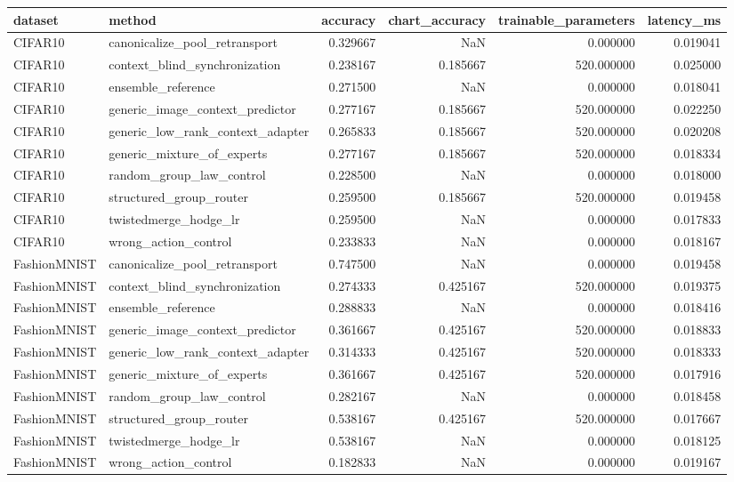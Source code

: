 \begin{tabular}{llrrrr}
\toprule
dataset & method & accuracy & chart_accuracy & trainable_parameters & latency_ms \\
\midrule
CIFAR10 & canonicalize_pool_retransport & 0.329667 & NaN & 0.000000 & 0.019041 \\
CIFAR10 & context_blind_synchronization & 0.238167 & 0.185667 & 520.000000 & 0.025000 \\
CIFAR10 & ensemble_reference & 0.271500 & NaN & 0.000000 & 0.018041 \\
CIFAR10 & generic_image_context_predictor & 0.277167 & 0.185667 & 520.000000 & 0.022250 \\
CIFAR10 & generic_low_rank_context_adapter & 0.265833 & 0.185667 & 520.000000 & 0.020208 \\
CIFAR10 & generic_mixture_of_experts & 0.277167 & 0.185667 & 520.000000 & 0.018334 \\
CIFAR10 & random_group_law_control & 0.228500 & NaN & 0.000000 & 0.018000 \\
CIFAR10 & structured_group_router & 0.259500 & 0.185667 & 520.000000 & 0.019458 \\
CIFAR10 & twistedmerge_hodge_lr & 0.259500 & NaN & 0.000000 & 0.017833 \\
CIFAR10 & wrong_action_control & 0.233833 & NaN & 0.000000 & 0.018167 \\
FashionMNIST & canonicalize_pool_retransport & 0.747500 & NaN & 0.000000 & 0.019458 \\
FashionMNIST & context_blind_synchronization & 0.274333 & 0.425167 & 520.000000 & 0.019375 \\
FashionMNIST & ensemble_reference & 0.288833 & NaN & 0.000000 & 0.018416 \\
FashionMNIST & generic_image_context_predictor & 0.361667 & 0.425167 & 520.000000 & 0.018833 \\
FashionMNIST & generic_low_rank_context_adapter & 0.314333 & 0.425167 & 520.000000 & 0.018333 \\
FashionMNIST & generic_mixture_of_experts & 0.361667 & 0.425167 & 520.000000 & 0.017916 \\
FashionMNIST & random_group_law_control & 0.282167 & NaN & 0.000000 & 0.018458 \\
FashionMNIST & structured_group_router & 0.538167 & 0.425167 & 520.000000 & 0.017667 \\
FashionMNIST & twistedmerge_hodge_lr & 0.538167 & NaN & 0.000000 & 0.018125 \\
FashionMNIST & wrong_action_control & 0.182833 & NaN & 0.000000 & 0.019167 \\
\bottomrule
\end{tabular}
